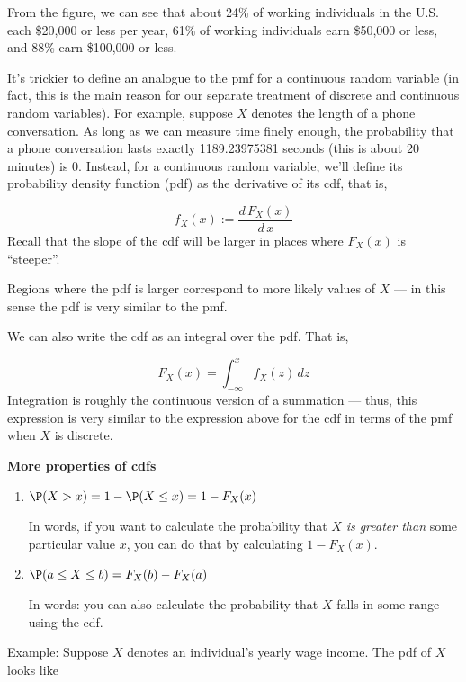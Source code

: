 \documentclass[
  letterpaper,
  DIV=11,
  numbers=noendperiod]{scrreprt}
\begin{document}
From the figure, we can see that about 24\% of working individuals in
the U.S. each \$20,000 or less per year, 61\% of working individuals
earn \$50,000 or less, and 88\% earn \$100,000 or less.

It's trickier to define an analogue to the pmf for a continuous random
variable (in fact, this is the main reason for our separate treatment of
discrete and continuous random variables). For example, suppose \(X\)
denotes the length of a phone conversation. As long as we can measure
time finely enough, the probability that a phone conversation lasts
exactly 1189.23975381 seconds (this is about 20 minutes) is 0. Instead,
for a continuous random variable, we'll define its probability density
function (pdf) as the derivative of its cdf, that is,

\[
  f_X(x) := \frac{d \, F_X(x)}{d \, x}
\] Recall that the slope of the cdf will be larger in places where
\(F_X(x)\) is ``steeper''.

Regions where the pdf is larger correspond to more likely values of
\(X\) --- in this sense the pdf is very similar to the pmf.

We can also write the cdf as an integral over the pdf. That is,

\[
  F_X(x) = \int_{-\infty}^x f_X(z) \, dz
\] Integration is roughly the continuous version of a summation ---
thus, this expression is very similar to the expression above for the
cdf in terms of the pmf when \(X\) is discrete.

\textbf{More properties of cdfs}

\begin{enumerate}
\def\labelenumi{\arabic{enumi}.}
\setcounter{enumi}{3}
\item
  \(\P(X > x) = 1 - \P(X \leq x) = 1-F_X(x)\)

  In words, if you want to calculate the probability that \(X\) \emph{is
  greater than} some particular value \(x\), you can do that by
  calculating \(1-F_X(x)\).
\item
  \(\P(a \leq X \leq b) = F_X(b) - F_X(a)\)

  In words: you can also calculate the probability that \(X\) falls in
  some range using the cdf.
\end{enumerate}

{Example: } Suppose \(X\) denotes an individual's yearly wage income.
The pdf of \(X\) looks like
\end{document}
